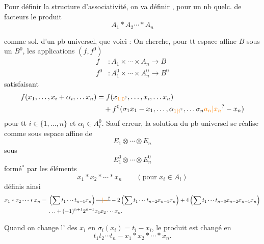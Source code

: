 Pour définir la structure d'associativité, on va définir , pour un nb quelc. de facteurs  le produit
\[
 A_1\ast A_2\cdots\ast A_n
\]

comme sol. d'un pb universel, que voici : On cherche, pour tt espace affine $B$ sous un  $B^0$, les  applications $(f,f^0)$
\[
 \begin{aligned}
 f &: A_1\times\cdots\times A_n\longrightarrow B\\
 f^0 &: A_1^0\times\cdots\times A_n^0\longrightarrow B^0
 \end{aligned}
\]
satisfaisant
\[
 \begin{aligned}
 f(x_1,\ldots,x_i+\alpha_i,\ldots x_n)&=f(x_{\unsure{1|0}},\ldots,x_i,\ldots x_n)\\
 &\quad+f^0(\sigma_1x_1-x_1,\ldots,\alpha_{\unsure{1|i}},\ldots\sigma_n\unsure{a_n|x_n}-x_n)
 \end{aligned}
\]
pour tt $i\in\{1,\ldots,n\}$ et $\alpha_i\in A_i^0$. Sauf erreur, la solution du pb universel se réalise comme sous espace affine de
\[
 E_1\otimes\cdots\otimes E_n
\]
sous
\[
 E_1^0\otimes\cdots\otimes E_n^0
\]
formé$^*$ par les éléments
\[
 x_1\ast x_2\ast\cdots\ast x_n\qquad(\text{pour }x_i\in A_i)
\]
définis ainsi
\[
 \begin{aligned}
 x_1\ast x_2\cdots\ast x_n={}&\left(\sum t_1\cdots t_{n-1}x_n\right)\deleted{\unsure{=|-}}-2\left(\sum t_1\cdots t_{n-2}x_{n-1}x_n\right)+4\left(\sum t_1\cdots t_{n-3}x_{n-2}x_{n-1}x_n\right)\\
 &\ldots+(-1)^{n+1}2^{n-1}x_1x_2\cdots x_n .
 \end{aligned}
\]

Quand on change l' des $x_i$ en $\sigma_i(x_i)=t_i-x_i$, le produit est changé en
\[
 t_1t_2\cdots t_n-x_1\ast x_2\ast\cdots\ast x_n.
\]


